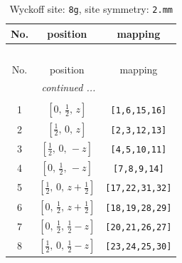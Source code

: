 \documentclass[fleqn,8pt]{jsarticle}
\begin{document}
\begin{longtable}{ccc}
\caption{Wyckoff site: {\tt 8g}, site symmetry: {\tt 2.mm}}
 \\
 \hline \hline
No. & position & mapping \\ \hline \endfirsthead

\multicolumn{2}{l}{\tablename\ \thetable{}} \\
 \hline \hline
No. & position & mapping \\ \hline \endhead

 \hline \hline
\multicolumn{2}{r}{\footnotesize\it continued ...} \\ \endfoot

 \hline \hline
\multicolumn{2}{r}{} \\ \endlastfoot

1 & $\left[ 0,\, \frac{1}{2},\, z \right]$ & {\tt [1,6,15,16]} \\ \hline
2 & $\left[ \frac{1}{2},\, 0,\, z \right]$ & {\tt [2,3,12,13]} \\ \hline
3 & $\left[ \frac{1}{2},\, 0,\, - z \right]$ & {\tt [4,5,10,11]} \\ \hline
4 & $\left[ 0,\, \frac{1}{2},\, - z \right]$ & {\tt [7,8,9,14]} \\ \hline
5 & $\left[ \frac{1}{2},\, 0,\, z + \frac{1}{2} \right]$ & {\tt [17,22,31,32]} \\ \hline
6 & $\left[ 0,\, \frac{1}{2},\, z + \frac{1}{2} \right]$ & {\tt [18,19,28,29]} \\ \hline
7 & $\left[ 0,\, \frac{1}{2},\, \frac{1}{2} - z \right]$ & {\tt [20,21,26,27]} \\ \hline
8 & $\left[ \frac{1}{2},\, 0,\, \frac{1}{2} - z \right]$ & {\tt [23,24,25,30]} \\
\end{longtable}
\renewcommand{\arraystretch}{1.2}
\end{document}
